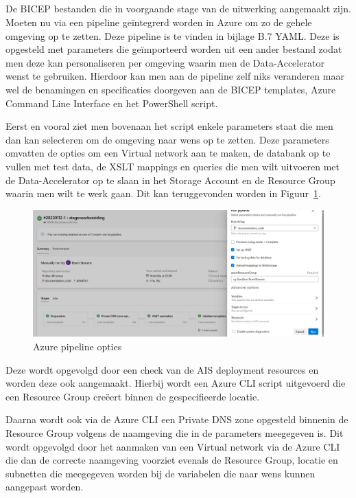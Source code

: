 \subsection{}%
\label{sec:Pipeline}

De BICEP bestanden die in voorgaande stage van de uitwerking aangemaakt zijn. Moeten nu via een pipeline geïntegrerd worden in Azure om zo de gehele omgeving op te zetten. Deze pipeline is te vinden in bijlage B.7 YAML. Deze is opgesteld met parameters die geïmporteerd worden uit een ander bestand zodat men deze kan personaliseren per omgeving waarin men de Data-Accelerator wenst te gebruiken. Hierdoor kan men aan de pipeline zelf niks veranderen maar wel de benamingen en specificaties doorgeven aan de BICEP templates, Azure Command Line Interface en het PowerShell script.

Eerst en vooral ziet men bovenaan het script enkele parameters staat die men dan kan selecteren om de omgeving naar wens op te zetten. Deze parameters omvatten de opties om een Virtual network aan te maken, de databank op te vullen met test data, de XSLT mappings en queries die men wilt uitvoeren met de Data-Accelerator op te slaan in het Storage Account en de Resource Group waarin men wilt te werk gaan. Dit kan teruggevonden worden in Figuur~\ref{fig:Opties}.

\begin{figure}
    \centering
    \includegraphics[scale=0.40]{../img/Pipeline.png}
    \caption{\label{fig:Opties}Azure pipeline opties}
\end{figure}

Deze wordt opgevolgd door een check  van de AIS deployment resources en worden deze ook aangemaakt. Hierbij wordt een Azure CLI script uitgevoerd die een Resource Group creëert binnen de gespecifieerde locatie.

Daarna wordt ook via de Azure CLI een Private DNS zone opgesteld binnenin de Resource Group volgens de naamgeving die in de parameters meegegeven is. Dit wordt opgevolgd door het aanmaken van een Virtual network via de Azure CLI die dan de correcte naamgeving voorziet evenals de Resource Group, locatie en subnetten die meegegeven worden bij de variabelen die naar wens kunnen aangepast worden.

